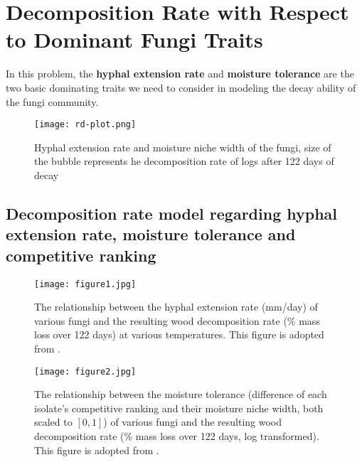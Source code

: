 \section{Decomposition Rate with Respect to Dominant Fungi Traits}\label{sec:rate}

In this problem, the \textbf{hyphal extension rate} and \textbf{moisture tolerance} are the two basic dominating traits we need to consider in modeling the decay ability of the fungi community.

\begin{figure}\label{fig:rd-plot}
    \begin{minipage}{0.6\textwidth}
        \texttt{[image: rd-plot.png]}
    \end{minipage}
    \begin{minipage}{0.4\textwidth}
        \caption{Hyphal extension rate and moisture niche width of the fungi, size of the bubble represents he decomposition rate of logs after 122 days of decay}
    \end{minipage}
\end{figure}


\subsection{Decomposition rate model regarding hyphal extension rate, moisture tolerance and competitive ranking}


\begin{figure}
    \centering
    \begin{minipage}[t]{0.48\textwidth}
        \centering
        \texttt{[image: figure1.jpg]}
        \caption{The relationship between the hyphal extension rate (mm/day) of various fungi and the resulting wood decomposition rate (\% mass loss over 122 days) at various temperatures. This figure is adopted from \cite{Lustenshouwer}.}\label{fig:hyphal}
    \end{minipage}
    \begin{minipage}[t]{0.48\textwidth}
        \centering
        \texttt{[image: figure2.jpg]}
        \caption{The relationship between the moisture tolerance (difference of each isolate’s competitive ranking and their moisture niche width, both scaled to $[0,1]$) of various fungi and the resulting wood decomposition rate (\% mass loss over 122 days, log transformed). This figure is adopted from \cite{Lustenshouwer}.}\label{fig:moisture}
    \end{minipage}
\end{figure}


